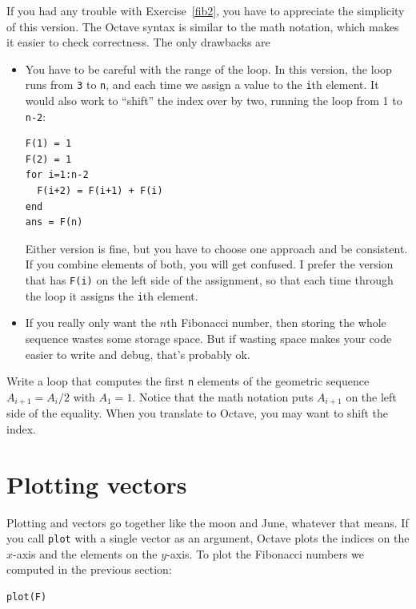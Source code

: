 \documentclass{book}
\begin{document}
If you had any trouble with Exercise~\ref{fib2}, you have to
appreciate the simplicity of this version. The Octave syntax is
similar to the math notation, which makes it easier to check
correctness. The only drawbacks are

\begin{itemize}

\item You have to be careful with the range of the
loop. In this version, the loop runs from {\tt 3} to {\tt n},
and each time we assign a value to the {\tt i}th element. It
would also work to ``shift'' the index over by two,
running the loop from 1 to {\tt n-2}:

\begin{verbatim}
F(1) = 1
F(2) = 1
for i=1:n-2
  F(i+2) = F(i+1) + F(i)
end
ans = F(n)
\end{verbatim}

Either version is fine, but you have to choose one approach
and be consistent. If you combine elements of both, you will
get confused. I prefer the version that has {\tt F(i)} on the
left side of the assignment, so that each time through the loop
it assigns the {\tt i}th element.

\item If you really only want the $n$th Fibonacci number, then storing
the whole sequence wastes some storage space. But if wasting space
makes your code easier to write and debug, that's probably ok.

\end{itemize}

\begin{ex}
Write a loop that computes the first {\tt n} elements
of the geometric sequence $A_{i+1} = A_i/2$ with $A_1 = 1$. Notice that
the math notation puts $A_{i+1}$ on the left side of the equality.
When you translate to Octave, you may want to shift the index.
\end{ex}


\section{Plotting vectors}

Plotting and vectors go together like the moon and June, whatever that
means. If you call {\tt plot} with a single vector as an argument,
Octave plots the indices on the $x$-axis and the elements on the
$y$-axis. To plot the Fibonacci numbers we computed in the previous
section:

\begin{verbatim}
plot(F)
\end{verbatim}
\end{document}
